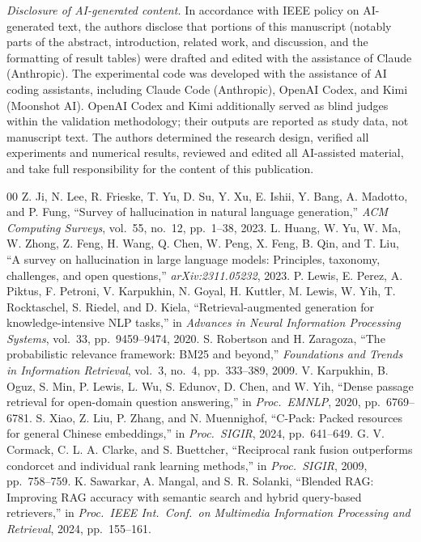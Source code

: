 \documentclass[conference]{IEEEtran}
\begin{document}
\textit{Disclosure of AI-generated content.} In accordance with IEEE policy on AI-generated text, the authors disclose that portions of this manuscript (notably parts of the abstract, introduction, related work, and discussion, and the formatting of result tables) were drafted and edited with the assistance of Claude (Anthropic). The experimental code was developed with the assistance of AI coding assistants, including Claude Code (Anthropic), OpenAI Codex, and Kimi (Moonshot AI). OpenAI Codex and Kimi additionally served as blind judges within the validation methodology; their outputs are reported as study data, not manuscript text. The authors determined the research design, verified all experiments and numerical results, reviewed and edited all AI-assisted material, and take full responsibility for the content of this publication.
\begin{thebibliography}{00}
 Z. Ji, N. Lee, R. Frieske, T. Yu, D. Su, Y. Xu, E. Ishii, Y. Bang, A. Madotto, and P. Fung, ``Survey of hallucination in natural language generation,'' \textit{ACM Computing Surveys}, vol.\ 55, no.\ 12, pp.\ 1--38, 2023.
 L. Huang, W. Yu, W. Ma, W. Zhong, Z. Feng, H. Wang, Q. Chen, W. Peng, X. Feng, B. Qin, and T. Liu, ``A survey on hallucination in large language models: Principles, taxonomy, challenges, and open questions,'' \textit{arXiv:2311.05232}, 2023.
 P. Lewis, E. Perez, A. Piktus, F. Petroni, V. Karpukhin, N. Goyal, H. Kuttler, M. Lewis, W. Yih, T. Rocktaschel, S. Riedel, and D. Kiela, ``Retrieval-augmented generation for knowledge-intensive NLP tasks,'' in \textit{Advances in Neural Information Processing Systems}, vol.\ 33, pp.\ 9459--9474, 2020.
 S. Robertson and H. Zaragoza, ``The probabilistic relevance framework: BM25 and beyond,'' \textit{Foundations and Trends in Information Retrieval}, vol.\ 3, no.\ 4, pp.\ 333--389, 2009.
 V. Karpukhin, B. Oguz, S. Min, P. Lewis, L. Wu, S. Edunov, D. Chen, and W. Yih, ``Dense passage retrieval for open-domain question answering,'' in \textit{Proc.\ EMNLP}, 2020, pp.\ 6769--6781.
 S. Xiao, Z. Liu, P. Zhang, and N. Muennighof, ``C-Pack: Packed resources for general Chinese embeddings,'' in \textit{Proc.\ SIGIR}, 2024, pp.\ 641--649.
 G. V. Cormack, C. L. A. Clarke, and S. Buettcher, ``Reciprocal rank fusion outperforms condorcet and individual rank learning methods,'' in \textit{Proc.\ SIGIR}, 2009, pp.\ 758--759.
 K. Sawarkar, A. Mangal, and S. R. Solanki, ``Blended RAG: Improving RAG accuracy with semantic search and hybrid query-based retrievers,'' in \textit{Proc.\ IEEE Int.\ Conf.\ on Multimedia Information Processing and Retrieval}, 2024, pp.\ 155--161.

\end{thebibliography}
\end{document}
